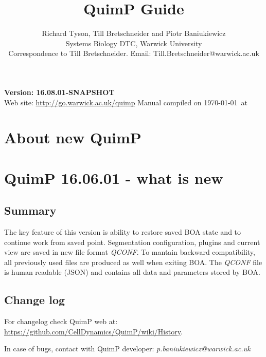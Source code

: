 \documentclass[a4paper,12pt]{article}
\begin{document}
\title{QuimP Guide}
\author{Richard Tyson, Till Bretschneider and Piotr Baniukiewicz\\ \small Systems Biology DTC, Warwick University\\ \small Correspondence to Till Bretschneider. Email: Till.Bretschneider@warwick.ac.uk\\}
\date{}
\maketitle
\begin{center}
\textbf{{\large Version: 16.08.01-SNAPSHOT}}\\
\vspace{1cm}
Web site: \url{http://go.warwick.ac.uk/quimp}
\vfill
{\footnotesize Manual compiled on \today\  at \currenttime}
\end{center}

\tableofcontents

\setlength{\parskip}{10pt}
\setlength{\parindent}{0pt}

\section{About new QuimP}

\section{QuimP 16.06.01 - what is new}

\subsection{Summary}
The key feature of this version is ability to restore saved BOA state and to continue work from saved point. Segmentation configuration, plugins and current view are saved in new file format \textit{QCONF}. To mantain backward compatibility, all previously used files are produced as well when exiting BOA. The \textit{QCONF} file is human readable (JSON) and contains all data and parameters stored by BOA.   
\subsection{Change log}
For changelog check QuimP web at: \url{https://github.com/CellDynamics/QuimP/wiki/History}.
	
In case of bugs, contact with QuimP developer: \textit{p.baniukiewicz@warwick.ac.uk}
\end{document}
